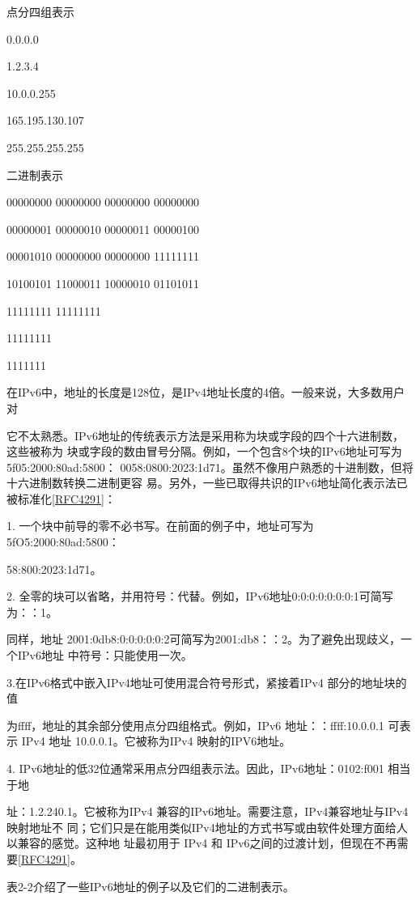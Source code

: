 点分四组表示

0.0.0.0

1.2.3.4

10.0.0.255

165.195.130.107

255.255.255.255

二进制表示

00000000 00000000 00000000 00000000

00000001 00000010 00000011 00000100

00001010 00000000 00000000 11111111

10100101 11000011 10000010 01101011

11111111 11111111

11111111

1111111

在IPv6中，地址的长度是128位，是IPv4地址长度的4倍。一般来说，大多数用户对

它不太熟悉。IPv6地址的传统表示方法是采用称为块或字段的四个十六进制数，这些被称为
块或字段的数由冒号分隔。例如，一个包含8个块的IPv6地址可写为 5f05:2000:80ad:5800：
0058:0800:2023:1d71。虽然不像用户熟悉的十进制数，但将十六进制数转换二进制更容
易。另外，一些已取得共识的IPv6地址简化表示法已被标准化\href{https://www.rfc-editor.org/rfc/rfc4291}{[RFC4291]}：

1. 一个块中前导的零不必书写。在前面的例子中，地址可写为5fO5:2000:80ad:5800：

58:800:2023:1d71。

2. 全零的块可以省略，并用符号：代替。例如，IPv6地址0:0:0:0:0:0:0:1可简写为：：1。

同样，地址 2001:0db8:0:0:0:0:0:2可简写为2001:db8：：2。为了避免出现歧义，一个IPv6地址
中符号：只能使用一次。

3.在IPv6格式中嵌入IPv4地址可使用混合符号形式，紧接着IPv4 部分的地址块的值

为ffff，地址的其余部分使用点分四组格式。例如，IPv6 地址：：ffff:10.0.0.1 可表示 IPv4 地址
10.0.0.1。它被称为IPv4 映射的IPV6地址。

4. IPv6地址的低32位通常采用点分四组表示法。因此，IPv6地址：0102:f001 相当于地

址：1.2.240.1。它被称为IPv4 兼容的IPv6地址。需要注意，IPv4兼容地址与IPv4 映射地址不
同；它们只是在能用类似IPv4地址的方式书写或由软件处理方面给人以兼容的感觉。这种地
址最初用于 IPv4 和 IPv6之间的过渡计划，但现在不再需要\href{https://www.rfc-editor.org/rfc/rfc4291}{[RFC4291]}。

表2-2介绍了一些IPv6地址的例子以及它们的二进制表示。

